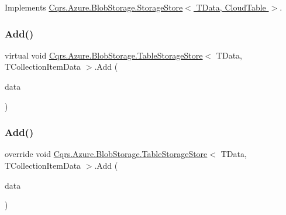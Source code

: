 Implements \hyperlink{classCqrs_1_1Azure_1_1BlobStorage_1_1StorageStore_af56bdbd7fa6650aaef5c0bab9ed55f1a}{Cqrs.\+Azure.\+Blob\+Storage.\+Storage\+Store$<$ T\+Data, Cloud\+Table $>$}.

\mbox{\label{classCqrs_1_1Azure_1_1BlobStorage_1_1TableStorageStore_aa8e6b41c32dd8f81d5ff852693e7979d}} 
\subsubsection{\texorpdfstring{Add()}{Add()}\hspace{0.1cm}{\footnotesize\ttfamily [2/6]}}
{\footnotesize\ttfamily virtual void \hyperlink{classCqrs_1_1Azure_1_1BlobStorage_1_1TableStorageStore}{Cqrs.\+Azure.\+Blob\+Storage.\+Table\+Storage\+Store}$<$ T\+Data, T\+Collection\+Item\+Data $>$.Add (\begin{DoxyParamCaption}\item[{I\+Table\+Entity}]{data }\end{DoxyParamCaption})\hspace{0.3cm}{\ttfamily [virtual]}}

\mbox{\label{classCqrs_1_1Azure_1_1BlobStorage_1_1TableStorageStore_a2b10c02a19150d5a68e6dcb4810ea8a1}} 
\subsubsection{\texorpdfstring{Add()}{Add()}\hspace{0.1cm}{\footnotesize\ttfamily [3/6]}}
{\footnotesize\ttfamily override void \hyperlink{classCqrs_1_1Azure_1_1BlobStorage_1_1TableStorageStore}{Cqrs.\+Azure.\+Blob\+Storage.\+Table\+Storage\+Store}$<$ T\+Data, T\+Collection\+Item\+Data $>$.Add (\begin{DoxyParamCaption}\item[{I\+Enumerable$<$ T\+Data $>$}]{data }\end{DoxyParamCaption})\hspace{0.3cm}{\ttfamily [virtual]}}



